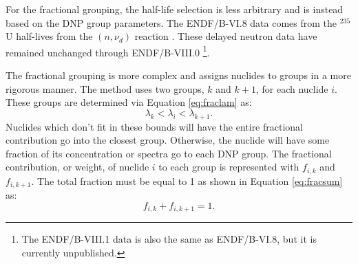 For the fractional grouping, the half-life selection is less arbitrary and is instead based on the \gls{DNP} group parameters.
The ENDF/B-VI.8 data comes from the $^{235}$U half-lives from the $(n, \nu_d)$ reaction \cite{endf6, brady1989delayed, england1988status, brady1989validation}.
These delayed neutron data have remained unchanged through ENDF/B-VIII.0 \cite{Brown20181, endf6}\footnote{The ENDF/B-VIII.1 data is also the same as ENDF/B-VI.8, but it is currently unpublished.}.

The fractional grouping is more complex and assigns nuclides to groups in a more rigorous manner.
The method uses two groups, $k$ and $k+1$, for each nuclide $i$.
These groups are determined via Equation \eqref{eq:fraclam} as:
\begin{equation}
    \lambda_k < \lambda_i < \lambda_{k+1}.
    \label{eq:fraclam}
\end{equation}
Nuclides which don't fit in these bounds will have the entire fractional contribution go into the closest group.
Otherwise, the nuclide will have some fraction of its concentration or spectra go to each \gls{DNP} group.
The fractional contribution, or weight, of nuclide $i$ to each group is represented with $f_{i, k}$ and $f_{i, k+1}$. 
The total fraction must be equal to 1 as shown in Equation \eqref{eq:fracsum} as:
\begin{equation}
    f_{i, k} + f_{i, k+1} = 1.
    \label{eq:fracsum}
\end{equation}

